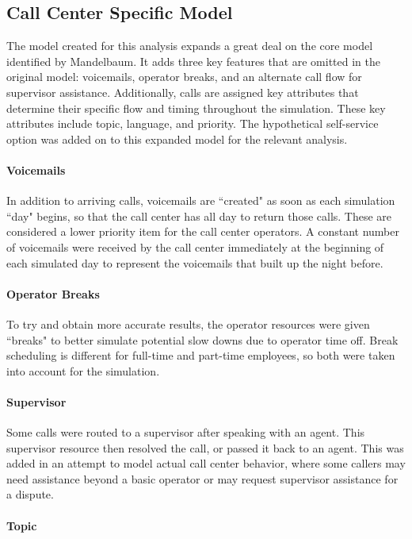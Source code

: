 \documentclass[12pt]{article}
\begin{document}
\subsection{Call Center Specific Model}
The model created for this analysis expands a great deal on the core model identified by Mandelbaum.  It adds three key features that are omitted in the original model: voicemails, operator breaks, and an alternate call flow for supervisor assistance.  Additionally, calls are assigned key attributes that determine their specific flow and timing throughout the simulation.  These key attributes include topic, language, and priority.  The hypothetical self-service option was added on to this expanded model for the relevant analysis.

	\paragraph{Voicemails}
	
In addition to arriving calls, voicemails are ``created" as soon as each simulation ``day" begins, so that the call center has all day to return those calls.  These are considered a lower priority item for the call center operators.  A constant number of voicemails were received by the call center immediately at the beginning of each simulated day to represent the voicemails that built up the night before.

	\paragraph{Operator Breaks}

To try and obtain more accurate results, the operator resources were given ``breaks" to better simulate potential slow downs due to operator time off. Break scheduling is different for full-time and part-time employees, so both were taken into account for the simulation.

	\paragraph{Supervisor}
	
Some calls were routed to a supervisor after speaking with an agent.  This supervisor resource then resolved the call, or passed it back to an agent.  This was added in an attempt to model actual call center behavior, where some callers may need assistance beyond a basic operator or may request supervisor assistance for a dispute. 

	\paragraph{Topic}
\end{document}
